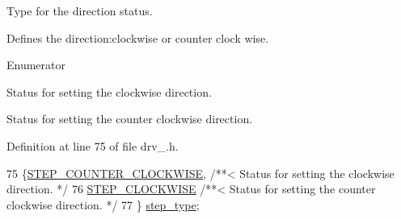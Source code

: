 Type for the direction status. 

Defines the direction\-:clockwise or counter clock wise. \begin{Desc}
\item[Enumerator]\par
\begin{description}
\item[{\em 
\hypertarget{group__DRV8825_gga3af682b92aa259509aea217f6dc64356a05e804aea3cc6dd53f5d5a836d0365c9}{S\-T\-E\-P\-\_\-\-C\-O\-U\-N\-T\-E\-R\-\_\-\-C\-L\-O\-C\-K\-W\-I\-S\-E}\label{group__DRV8825_gga3af682b92aa259509aea217f6dc64356a05e804aea3cc6dd53f5d5a836d0365c9}
}]Status for setting the clockwise direction. \item[{\em 
\hypertarget{group__DRV8825_gga3af682b92aa259509aea217f6dc64356aafe6025725d6001f0b0a973f1e719cc4}{S\-T\-E\-P\-\_\-\-C\-L\-O\-C\-K\-W\-I\-S\-E}\label{group__DRV8825_gga3af682b92aa259509aea217f6dc64356aafe6025725d6001f0b0a973f1e719cc4}
}]Status for setting the counter clockwise direction. \end{description}
\end{Desc}


Definition at line 75 of file drv\-\_.\-h.


\begin{DoxyCode}
75              \{\hyperlink{group__DRV8825_gga3af682b92aa259509aea217f6dc64356a05e804aea3cc6dd53f5d5a836d0365c9}{STEP\_COUNTER\_CLOCKWISE},   \textcolor{comment}{/**< Status for setting the clockwise
       direction. */}
76         \hyperlink{group__DRV8825_gga3af682b92aa259509aea217f6dc64356aafe6025725d6001f0b0a973f1e719cc4}{STEP\_CLOCKWISE}                  \textcolor{comment}{/**< Status for setting the counter clockwise
       direction. */}
77         \} \hyperlink{group__DRV8825_ga3af682b92aa259509aea217f6dc64356}{step\_type};
\end{DoxyCode}


